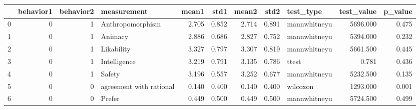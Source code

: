 \begin{tabular}{lrrlrrrrlrr}
\toprule
{} &  behavior1 &  behavior2 &              measurement &  mean1 &   std1 &  mean2 &   std2 &     test\_type &  test\_value &  p\_value \\
\midrule
0 &          0 &          1 &         Anthropomorphism &  2.705 &  0.852 &  2.714 &  0.891 &  mannwhitneyu &    5696.000 &    0.475 \\
1 &          0 &          1 &                  Animacy &  2.886 &  0.686 &  2.827 &  0.752 &  mannwhitneyu &    5394.000 &    0.232 \\
2 &          0 &          1 &               Likability &  3.327 &  0.797 &  3.307 &  0.819 &  mannwhitneyu &    5661.500 &    0.445 \\
3 &          0 &          1 &             Intelligence &  3.219 &  0.791 &  3.135 &  0.786 &         ttest &       0.781 &    0.436 \\
4 &          0 &          1 &                   Safety &  3.196 &  0.557 &  3.252 &  0.677 &  mannwhitneyu &    5232.500 &    0.135 \\
5 &          0 &          0 &  agreement with rational &  0.140 &  0.400 &  0.140 &  0.400 &      wilcoxon &    1293.000 &    0.001 \\
6 &          0 &          0 &                   Prefer &  0.449 &  0.500 &  0.449 &  0.500 &  mannwhitneyu &    5724.500 &    0.499 \\
\bottomrule
\end{tabular}
